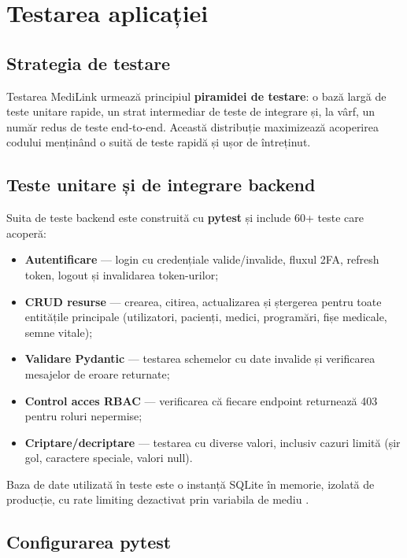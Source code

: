 \section{Testarea aplicației}

\subsection{Strategia de testare}

Testarea MediLink urmează principiul \textbf{piramidei de testare}: o bază largă de teste unitare rapide, un strat intermediar de teste de integrare și, la vârf, un număr redus de teste end-to-end. Această distribuție maximizează acoperirea codului menținând o suită de teste rapidă și ușor de întreținut.

\subsection{Teste unitare și de integrare backend}

Suita de teste backend este construită cu \textbf{pytest} \cite{pytest2024} și include 60+ teste care acoperă:

\begin{itemize}
  \item \textbf{Autentificare} --- login cu credențiale valide/invalide, fluxul 2FA, refresh token, logout și invalidarea token-urilor;
  \item \textbf{CRUD resurse} --- crearea, citirea, actualizarea și ștergerea pentru toate entitățile principale (utilizatori, pacienți, medici, programări, fișe medicale, semne vitale);
  \item \textbf{Validare Pydantic} --- testarea schemelor cu date invalide și verificarea mesajelor de eroare returnate;
  \item \textbf{Control acces RBAC} --- verificarea că fiecare endpoint returnează 403 pentru roluri nepermise;
  \item \textbf{Criptare/decriptare} --- testarea  cu diverse valori, inclusiv cazuri limită (șir gol, caractere speciale, valori null).
\end{itemize}

Baza de date utilizată în teste este o instanță SQLite în memorie, izolată de producție, cu rate limiting dezactivat prin variabila de mediu .

\subsection{Configurarea pytest}

